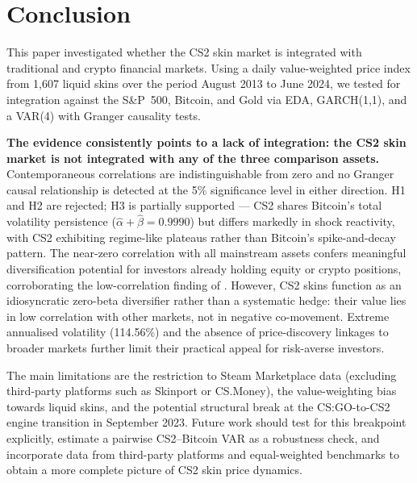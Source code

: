 \section{Conclusion}
\label{sec:conclusion}

This paper investigated whether the CS2 skin market is integrated with
traditional and crypto financial markets. Using a daily value-weighted price
index from 1,607 liquid skins over the period August 2013 to June 2024, we
tested for integration against the S\&P~500, Bitcoin, and Gold via EDA,
GARCH(1,1), and a VAR(4) with Granger causality tests.

\textbf{The evidence consistently points to a lack of integration: the CS2 skin
market is not integrated with any of the three comparison assets.}
Contemporaneous correlations are indistinguishable from zero and no Granger
causal relationship is detected at the 5\% significance level in either
direction. H1 and H2 are rejected; H3 is partially supported --- CS2 shares
Bitcoin's total volatility persistence ($\hat{\alpha}+\hat{\beta}=0.9990$)
but differs markedly in shock reactivity, with CS2 exhibiting regime-like
plateaus rather than Bitcoin's spike-and-decay pattern. The near-zero
correlation with all mainstream assets confers meaningful diversification
potential for investors already holding equity or crypto positions, corroborating
the low-correlation finding of \citeauthor{dobrynskaya2025videogame}
\cite{dobrynskaya2025videogame}. However, CS2 skins function as an idiosyncratic
zero-beta diversifier rather than a systematic hedge: their value lies in low
correlation with other markets, not in negative co-movement. Extreme annualised
volatility (114.56\%) and the absence of price-discovery linkages to broader
markets further limit their practical appeal for risk-averse investors.

The main limitations are the restriction to Steam Marketplace data (excluding
third-party platforms such as Skinport or CS.Money), the value-weighting bias
towards liquid skins, and the potential structural break at the CS:GO-to-CS2
engine transition in September 2023. Future work should test for this breakpoint
explicitly, estimate a pairwise CS2--Bitcoin VAR as a robustness check, and
incorporate data from third-party platforms and equal-weighted benchmarks to
obtain a more complete picture of CS2 skin price dynamics.
